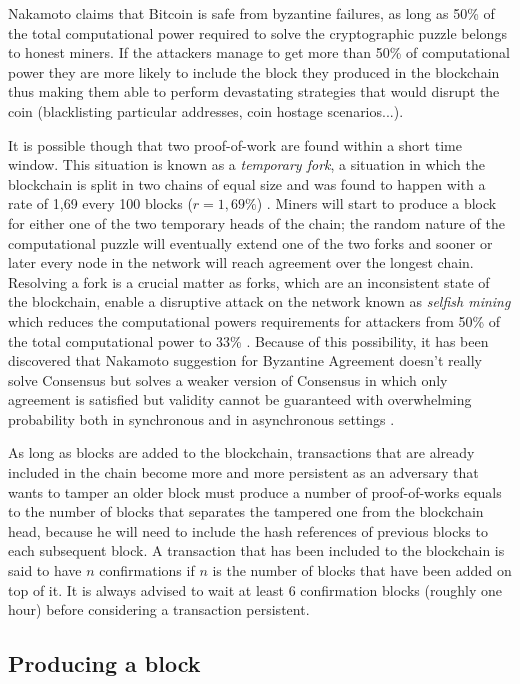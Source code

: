 		Nakamoto claims that Bitcoin is safe from byzantine failures, as long as 50\% of the total computational power required to solve the cryptographic puzzle belongs to honest miners. If the attackers manage to get more than 50\% of computational power they are more likely to include the block they produced in the blockchain thus making them able to perform devastating strategies that would disrupt the coin (blacklisting particular addresses, coin hostage scenarios...).
		
		It is possible though that two proof-of-work are found within a short time window. This situation is known as a \textit{temporary fork}, a situation in which the blockchain is split in two chains of equal size and was found to happen with a rate of 1,69 every 100 blocks (\(r = 1,69\%\)) \cite{Decker2013}. Miners will start to produce a block for either one of the two temporary heads of the chain; the random nature of the computational puzzle will eventually extend one of the two forks and sooner or later every node in the network will reach agreement over the longest chain. Resolving a fork is a crucial matter as forks, which are an inconsistent state of the blockchain, enable a disruptive attack on the network known as \textit{selfish mining} which reduces the computational powers requirements for attackers from 50\% of the total computational power to 33\% \cite{Eyal2013}. Because of this possibility, it has been discovered that Nakamoto suggestion for Byzantine Agreement doesn’t really solve Consensus but solves a weaker version of Consensus in which only agreement is satisfied but validity cannot be guaranteed with overwhelming probability both in synchronous \cite{Garay2015} and in asynchronous settings \cite{Pass2016}.
		
		As long as blocks are added to the blockchain, transactions that are already included in the chain become more and more persistent as an adversary that wants to tamper an older block must produce a number of proof-of-works equals to the number of blocks that separates the tampered one from the blockchain head, because he will need to include the hash references of previous blocks to each subsequent block. A transaction that has been included to the blockchain is said to have $n$ confirmations if $n$ is the number of blocks that have been added on top of it. It is always advised to wait at least 6 confirmation blocks (roughly one hour) before considering a transaction persistent.
		
		\subsection{Producing a block}
		
